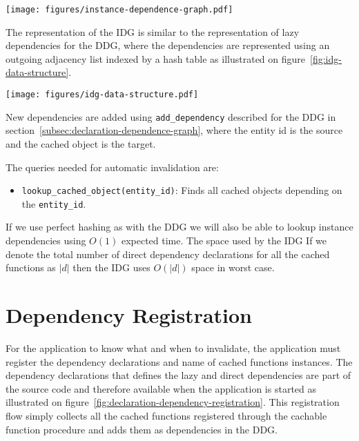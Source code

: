 \begin{figure*}[ht!]
  \centering
  \texttt{[image: figures/instance-dependence-graph.pdf]}
  \caption{An example of an Instance Dependence Graph based on the running example}
  \label{fig:instance-dependence-graph}
\end{figure*}

The representation of the IDG is similar to the representation of lazy dependencies for the DDG, where the dependencies are represented using an outgoing adjacency list indexed by a hash table as illustrated on figure~\ref{fig:idg-data-structure}.

\begin{figure*}[ht!]
  \centering
  \texttt{[image: figures/idg-data-structure.pdf]}
  \caption{An illustration of the data structure representing the IDG on figure~\ref{fig:instance-dependence-graph}}
  \label{fig:idg-data-structure}
\end{figure*}

New dependencies are added using \verb$add_dependency$ described for the DDG in section~\ref{subsec:declaration-dependence-graph}, where the entity id is the source and the cached object is the target.

The queries needed for automatic invalidation are:

\begin{itemize}
  \item \verb$lookup_cached_object(entity_id)$: Finds all cached objects depending on the \verb$entity_id$.
\end{itemize}

If we use perfect hashing as with the DDG we will also be able to lookup instance dependencies using $O(1)$ expected time. The space used by the IDG If we denote the total number of direct dependency declarations for all the cached functions as $|d|$ then the IDG uses $O(|d|)$ space in worst case.



\section{Dependency Registration}
\label{sec:dependency-registration}

For the application to know what and when to invalidate, the application must register the dependency declarations and name of cached functions instances. The dependency declarations that defines the lazy and direct dependencies are part of the source code and therefore available when the application is started as illustrated on figure~\ref{fig:declaration-dependency-registration}. This registration flow simply collects all the cached functions registered through the cachable function procedure and adds them as dependencies in the DDG.

